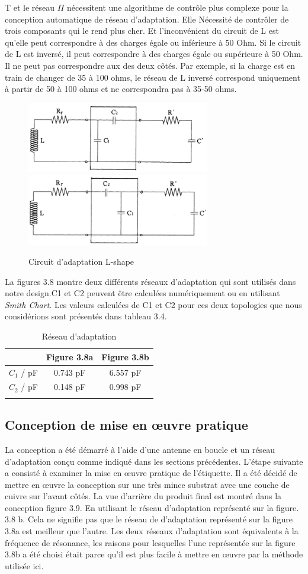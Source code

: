 \documentclass[11pt, a4paper, twoside]{book}
\begin{document}
T et le réseau \(\Pi\) nécessitent une algorithme de contrôle plus complexe pour la conception automatique de réseau d'adaptation. Elle Nécessité de contrôler de trois composants qui le rend plus cher. Et l'inconvénient du circuit de L est qu'elle peut correspondre à des charges égale ou inférieure à 50 Ohm. Si le circuit de L est inversé, il peut correspondre à des charges égale ou supérieure à 50 Ohm. Il ne peut pas correspondre aux des deux côtés. Par exemple, si la charge est en train de changer de 35 à 100 ohms, le réseau de L inversé correspond uniquement à partir de 50 à 100 ohms et ne correspondra pas à 35-50 ohms.
\begin{figure}[H]
\centering
\includegraphics[width=8cm]{matcha}
\includegraphics[width=8cm]{matchb}
\caption{Circuit d'adaptation L-shape}
\end{figure}
La figures 3.8 montre deux différents réseaux d'adaptation qui sont utilisés dans notre  design.C1 et C2 peuvent être calculées numériquement ou en utilisant \emph {Smith Chart}. Les valeurs calculées de C1 et C2 pour ces deux topologies que nous considérions sont présentés dans tableau 3.4.\\
\begin{longtable}[c]{| c | c | c |}
 \hline
  & Figure 3.8a & Figure 3.8b\\
 \hline
 \(C_{1}\) / pF & 0.743 pF & 6.557 pF\\
 \hline
 \(C_{2}\) / pF & 0.148 pF & 0.998 pF\\
 \hline
\caption{Réseau d'adaptation}
\end{longtable}
\subsection{Conception de mise en œuvre pratique}
La conception a été démarré à l'aide d'une antenne en boucle et un réseau d'adaptation conçu comme indiqué dans les sections précédentes. L'étape suivante a consisté à examiner la mise en œuvre pratique de l'étiquette. Il a été décidé de mettre en œuvre la conception sur une très mince substrat avec une couche de cuivre sur l'avant côtés. La vue d'arrière du produit final est montré dans la conception figure 3.9. En utilisant le réseau d'adaptation représenté sur la figure. 3.8 b. Cela ne signifie pas que le réseau de d'adaptation représenté sur la figure 3.8a est meilleur que l'autre. Les deux réseaux d'adaptation sont équivalents à la fréquence de résonance, les raisons pour lesquelles l'une représentée sur la figure 3.8b a été choisi était parce qu'il est plus facile à mettre en œuvre par la méthode utilisée ici.
\end{document}
